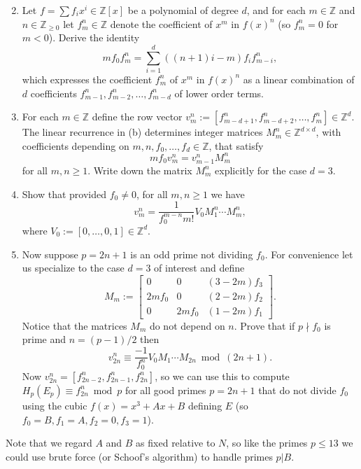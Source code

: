 \documentclass[11pt]{article}
\newcommand{\Z}{\mathbb{Z}}
\begin{document}
\begin{enumerate}[{\bf (a)}]
\setcounter{enumi}{1}
\item Let $f = \sum f_ix^i\in \Z[x]$ be a polynomial of degree $d$, and for each $m\in \Z$ and $n\in\Z_{\ge 0}$ let $f_m^n\in\Z$ denote the coefficient of $x^m$ in $f(x)^n$ (so $f_m^n=0$ for $m<0$).  Derive the identity
\[
mf_0f_m^n = \sum_{i=1}^d((n+1)i-m)f_if_{m-i}^n,
\]
which expresses the coefficient $f_m^n$ of $x^m$ in $f(x)^n$ as a linear combination of $d$ coefficients $f_{m-1}^n,f_{m-2}^n,\ldots,f_{m-d}^n$ of lower order terms.
\item For each $m\in \Z$ define the row vector $v_m^n:=[f^n_{m-d+1},f^n_{m-d+2},\ldots,f^n_m]\in \Z^d$.
The linear recurrence in (b) determines integer matrices $M_m^n\in \Z^{d\times d}$, with coefficients depending on $m,n,f_0,\ldots, f_d\in\Z$, that satisfy
\[
mf_0v_m^n = v_{m-1}^nM_m^n
\]
for all $m,n\ge 1$.  Write down the matrix $M_m^n$ explicitly for the case $d=3$.
\item Show that provided $f_0\ne 0$, for all $m,n\ge 1$ we have
\[
v_m^n = \frac{1}{f_0^{m-n}m!}V_0M_1^n\cdots M_m^n,
\]
where $V_0:=[0,\ldots,0,1]\in\Z^d$.
\item Now suppose $p=2n+1$ is an odd prime not dividing $f_0$.
For convenience let us specialize to the case $d=3$ of interest and define
\[
M_m := \begin{bmatrix}0&0&(3-2m)f_3\\2mf_0&0&(2-2m)f_2\\0&2mf_0&(1-2m)f_1\end{bmatrix}.
\]
Notice that the matrices $M_m$ do not depend on $n$.
Prove that if $p\nmid f_0$ is prime and $n=(p-1)/2$ then
\[
v_{2n}^n\equiv \frac{-1}{f_0^n}V_0M_1\cdots M_{2n}\bmod (2n+1).
\]
Now $v^{n}_{2n}=[f_{2n-2}^n,f_{2n-1}^n,f_{2n}^n]$, so we can use this to compute $H_p(E_p)\equiv f_{2n}^n\bmod p$ for all good primes $p=2n+1$ that do not divide $f_0$ using the cubic $f(x)=x^3+Ax+B$ defining $E$ (so $f_0=B,f_1=A,f_2=0,f_3=1$).
\end{enumerate}

Note that we regard $A$ and $B$ as fixed relative to $N$, so like the primes $p\le 13$ we could use brute force (or Schoof's algorithm) to handle primes $p|B$.
\end{document}

